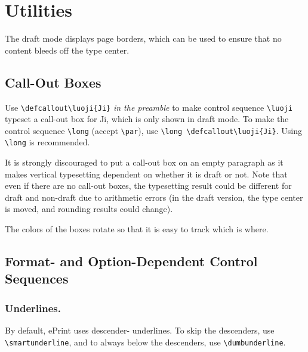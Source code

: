 \section{Utilities}

The draft mode displays page borders,
which can be used to ensure that no content bleeds off the type center.

\subsection{Call-Out Boxes}

Use
\texttt{\textbackslash defcallout\textbackslash luoji\{Ji\}}
\emph{in the preamble}
to make
control sequence \texttt{\textbackslash luoji} typeset a call-out box for Ji,
which is only shown in draft mode.
To make the control sequence
\texttt{\textbackslash long} (accept \texttt{\textbackslash par}),
use
\texttt{\textbackslash long%
\textbackslash defcallout\textbackslash luoji\{Ji\}}.
Using \texttt{\textbackslash long} is recommended.


It is strongly discouraged to put a call-out box on an empty paragraph
as it makes vertical typesetting dependent on whether it is draft or not.
Note that even if there are no call-out boxes,
the typesetting result could be different for draft and non-draft
due to arithmetic errors
(in the draft version,
the type center is moved, and
rounding results could change).

The colors of the boxes rotate so that it is easy to track which is where.

\subsection{Format- and Option-Dependent Control Sequences}

\subsubsection{Underlines.}
By default, ePrint uses descender- underlines.
To  skip the descenders,
use \texttt{\textbackslash smartunderline}, and
to always  below the descenders,
use \texttt{\textbackslash dumbunderline}.

